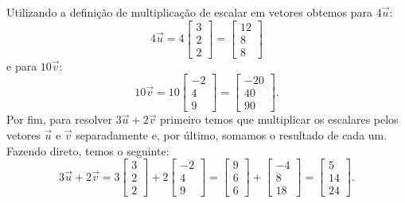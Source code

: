 \begin{resol}
Utilizando a definição de multiplicação de escalar em vetores obtemos para $4\vec{u}$:
\begin{equation}
 4\vec{u} =
4\left[
  \begin{array}{c}
    3 \\
    2 \\
    2
  \end{array}
\right] =
  \left[
  \begin{array}{c}
    12 \\
    8 \\
    8
  \end{array}
\right]
\end{equation}
e para $10\vec{v}$:
\begin{equation}
 10\vec{v} =
10\left[
  \begin{array}{c}
    -2 \\
    4 \\
    9
  \end{array}
\right] =
  \left[
  \begin{array}{c}
    -20 \\
    40 \\
    90
  \end{array}
\right].
\end{equation}
Por fim, para resolver $3\vec{u} + 2\vec{v}$ primeiro temos que multiplicar os escalares pelos vetores $\vec{u}$ e $\vec{v}$ separadamente e, por último, somamos o resultado de cada um. Fazendo direto, temos o seguinte:
\begin{equation}
 3\vec{u} + 2\vec{v} = 
3\left[
  \begin{array}{c}
    3 \\
    2 \\
    2
  \end{array}
\right] +
2\left[
  \begin{array}{c}
    -2 \\
    4 \\
    9
  \end{array}
\right] = 
\left[
  \begin{array}{c}
    9 \\
    6 \\
    6
  \end{array}
\right] +
  \left[
  \begin{array}{c}
    -4 \\
    8 \\
    18
  \end{array}
\right] = 
\left[
  \begin{array}{c}
    5 \\
    14 \\
    24
  \end{array}
\right]. 
\end{equation}
\end{resol}

